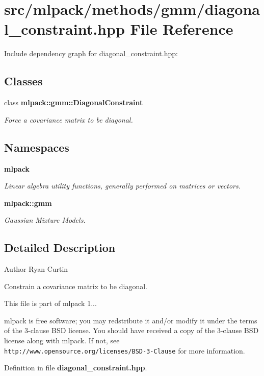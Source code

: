 \section{src/mlpack/methods/gmm/diagonal\-\_\-constraint.hpp File Reference}
\label{diagonal__constraint_8hpp}
Include dependency graph for diagonal\-\_\-constraint.\-hpp\-:
\subsection*{Classes}
\begin{DoxyCompactItemize}
\item 
class {\bf mlpack\-::gmm\-::\-Diagonal\-Constraint}
\begin{DoxyCompactList}\small\item\em Force a covariance matrix to be diagonal. \end{DoxyCompactList}\end{DoxyCompactItemize}
\subsection*{Namespaces}
\begin{DoxyCompactItemize}
\item 
{\bf mlpack}
\begin{DoxyCompactList}\small\item\em Linear algebra utility functions, generally performed on matrices or vectors. \end{DoxyCompactList}\item 
{\bf mlpack\-::gmm}
\begin{DoxyCompactList}\small\item\em Gaussian Mixture Models. \end{DoxyCompactList}\end{DoxyCompactItemize}


\subsection{Detailed Description}
\begin{DoxyAuthor}{Author}
Ryan Curtin
\end{DoxyAuthor}
Constrain a covariance matrix to be diagonal.

This file is part of mlpack 1...

mlpack is free software; you may redstribute it and/or modify it under the terms of the 3-\/clause B\-S\-D license. You should have received a copy of the 3-\/clause B\-S\-D license along with mlpack. If not, see {\tt http\-://www.\-opensource.\-org/licenses/\-B\-S\-D-\/3-\/\-Clause} for more information. 

Definition in file {\bf diagonal\-\_\-constraint.\-hpp}.

